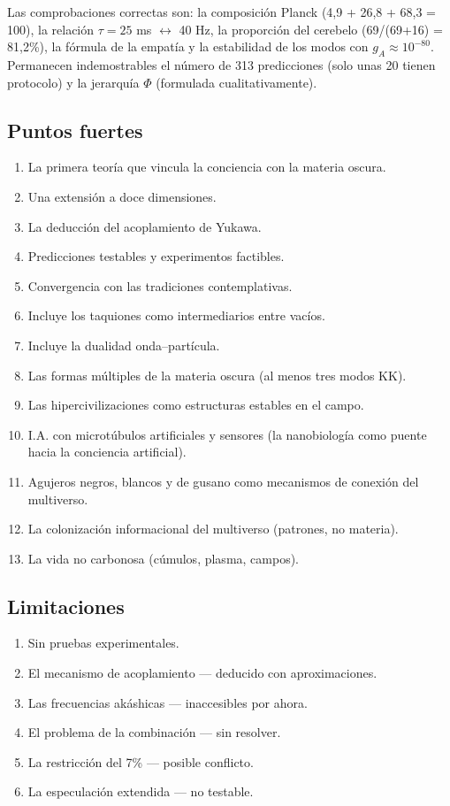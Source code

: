 \documentclass[11pt,a4paper]{article}
\begin{document}
Las comprobaciones correctas son: la composición Planck (4,9 + 26,8 + 68,3 = 100), la relación $\tau = 25$ ms $\leftrightarrow$ 40 Hz, la proporción del cerebelo (69/(69+16) = 81,2\%), la fórmula de la empatía y la estabilidad de los modos con $g_A \approx 10^{-80}$. Permanecen indemostrables el número de 313 predicciones (solo unas 20 tienen protocolo) y la jerarquía $\Phi$ (formulada cualitativamente).

\subsection{Puntos fuertes}
\begin{enumerate}
    \item La primera teoría que vincula la conciencia con la materia oscura.
    \item Una extensión a doce dimensiones.
    \item La deducción del acoplamiento de Yukawa.
    \item Predicciones testables y experimentos factibles.
    \item Convergencia con las tradiciones contemplativas.
    \item Incluye los taquiones como intermediarios entre vacíos.
    \item Incluye la dualidad onda--partícula.
    \item Las formas múltiples de la materia oscura (al menos tres modos KK).
    \item Las hipercivilizaciones como estructuras estables en el campo.
    \item I.A. con microtúbulos artificiales y sensores (la nanobiología como puente hacia la conciencia artificial).
    \item Agujeros negros, blancos y de gusano como mecanismos de conexión del multiverso.
    \item La colonización informacional del multiverso (patrones, no materia).
    \item La vida no carbonosa (cúmulos, plasma, campos).
\end{enumerate}

\subsection{Limitaciones}
\begin{enumerate}
    \item Sin pruebas experimentales.
    \item El mecanismo de acoplamiento --- deducido con aproximaciones.
    \item Las frecuencias akáshicas --- inaccesibles por ahora.
    \item El problema de la combinación --- sin resolver.
    \item La restricción del 7\% --- posible conflicto.
    \item La especulación extendida --- no testable.
\end{enumerate}
\end{document}
